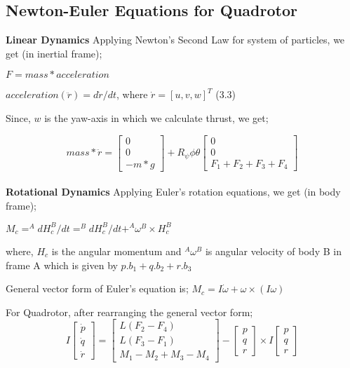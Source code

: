 \subsection{Newton-Euler Equations for Quadrotor}

\textbf{Linear Dynamics} Applying Newton's Second Law for system of particles, we get (in inertial frame);

$F = mass * acceleration$ 

$acceleration (\ddot{r}) = d\dot{r}/dt$, where $\dot{r} = [u,v,w]^T$ (3.3)
\vspace{10pt}

Since, $w$ is the yaw-axis in which we calculate thrust, we get;

\[
mass*\ddot{r} = \begin{bmatrix}
    0 \\
    0 \\
    -m*g
\end{bmatrix} + 
R_\psi\phi\theta \begin{bmatrix}
    0 \\
    0 \\
    F_1 + F_2 + F_3 + F_4
\end{bmatrix}
\]
\vspace{15pt}
\\

\textbf{Rotational Dynamics} Applying Euler's rotation equations, we get (in body frame);
\vspace{10pt}

$M_c = ^AdH_c^B/dt = ^BdH_c^B/dt + ^A\omega^B \times H_c^B$

where, $H_c$ is the angular momentum and $^A\omega^B$ is angular velocity of body B in frame A which is given by $p.b_1 + q.b_2 + r.b_3$
\vspace{10pt}

General vector form of Euler's equation is;
$M_c = I\dot{\omega} + \omega \times (I\omega)$
\vspace{10pt}

For Quadrotor, after rearranging the general vector form;
\[
I\begin{bmatrix}
    \dot{p} \\
    \dot{q} \\
    \dot{r}
\end{bmatrix} = 
\begin{bmatrix}
    L(F_2 - F_4) \\
    L(F_3 - F_1) \\
    M_1 - M_2 + M_3 - M_4
\end{bmatrix} - 
\begin{bmatrix}
    p \\
    q \\
    r
\end{bmatrix}
\times I\begin{bmatrix}
    p \\
    q \\
    r
\end{bmatrix}
\]
\vspace{10pt}

